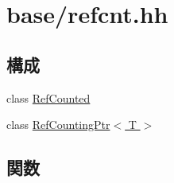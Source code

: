 \hypertarget{refcnt_8hh}{
\section{base/refcnt.hh}
\label{refcnt_8hh}
}
\subsection*{構成}
\begin{DoxyCompactItemize}
\item 
class \hyperlink{classRefCounted}{RefCounted}
\item 
class \hyperlink{classRefCountingPtr}{RefCountingPtr$<$ T $>$}
\end{DoxyCompactItemize}
\subsection*{関数}
